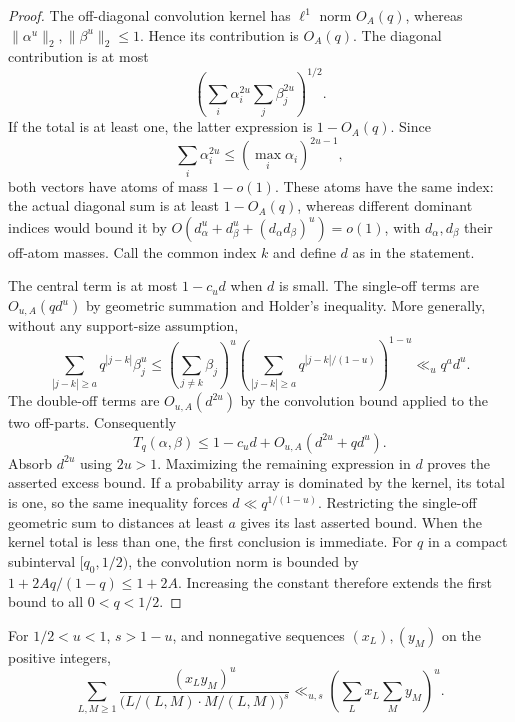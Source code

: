 \begin{proof}
The off-diagonal convolution kernel has $\ell^1$ norm $O_A(q)$, whereas
$\|\alpha^u\|_2,\|\beta^u\|_2\le1$. Hence its contribution is $O_A(q)$.
The diagonal contribution is at most
\[
 \left(\sum_i\alpha_i^{2u}\sum_j\beta_j^{2u}\right)^{1/2}.
\]
If the total is at least one, the latter expression is $1-O_A(q)$.
Since
\[
 \sum_i\alpha_i^{2u}\le(\max_i\alpha_i)^{2u-1},
\]
both vectors have atoms of mass $1-o(1)$. These atoms have the same index:
the actual diagonal sum is at least $1-O_A(q)$, whereas different
dominant indices would bound it by
$O(d_\alpha^u+d_\beta^u+(d_\alpha d_\beta)^u)=o(1)$, with
$d_\alpha,d_\beta$ their off-atom masses.
Call the common index $k$ and define $d$ as in the statement.

The central term is at most $1-c_ud$ when $d$ is small. The single-off
terms are $O_{u,A}(qd^u)$ by geometric summation and Holder's inequality.
More generally, without any support-size assumption,
\[
 \sum_{|j-k|\ge a}q^{|j-k|}\beta_j^u
 \le\left(\sum_{j\ne k}\beta_j\right)^u
 \left(\sum_{|j-k|\ge a}q^{|j-k|/(1-u)}\right)^{1-u}
 \ll_u q^a d^u.
\]
The double-off terms are $O_{u,A}(d^{2u})$ by the convolution bound applied
to the two off-parts. Consequently
\[
 T_q(\alpha,\beta)
 \le 1-c_ud+O_{u,A}(d^{2u}+qd^u).
\]
Absorb $d^{2u}$ using $2u>1$. Maximizing the remaining expression in $d$
proves the asserted excess bound. If a probability array is dominated by
the kernel, its total is one, so the same inequality forces
$d\ll q^{1/(1-u)}$. Restricting the single-off geometric sum to distances
at least $a$ gives its last asserted bound. When the kernel total is less
than one, the first conclusion is immediate.
For $q$ in a compact subinterval $[q_0,1/2)$, the convolution norm is
bounded by $1+2Aq/(1-q)\le1+2A$. Increasing the constant therefore
extends the first bound to all $0<q<1/2$.
\end{proof}

\begin{lemma}\label{ar:tensor}
For $1/2<u<1$, $s>1-u$, and nonnegative sequences $(x_L),(y_M)$ on the
positive integers,
\[
 \sum_{L,M\ge1}
 \frac{(x_Ly_M)^u}{\bigl(L/(L,M)\cdot M/(L,M)\bigr)^s}
 \ll_{u,s}\left(\sum_Lx_L\sum_My_M\right)^u.
\]
\end{lemma}


